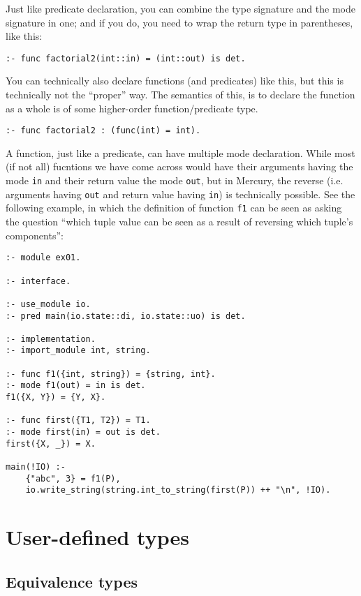   Just like predicate declaration, you can combine the type signature and the mode signature in one; and if you do, you need to wrap the return type in parentheses, like this:

\begin{lstlisting}[language=Mercury]
:- func factorial2(int::in) = (int::out) is det.
\end{lstlisting}

  You can technically also declare functions (and predicates) like this, but this is technically not the ``proper'' way. The semantics of this, is to declare the function as a whole is of some higher-order function/predicate type.
  
\begin{lstlisting}[language=Mercury]
:- func factorial2 : (func(int) = int).
\end{lstlisting}

A function, just like a predicate, can have multiple mode declaration. While most (if not all) fucntions we have come across would have their arguments having the mode \texttt{in} and their return value the mode \texttt{out}, but in Mercury, the reverse (i.e. arguments having \texttt{out} and return value having \texttt{in}) is technically possible. See the following example, in which the definition of function \texttt{f1} can be seen as asking the question ``which tuple value can be seen as a result of reversing which tuple's components'':

\begin{lstlisting}[language=Mercury]
:- module ex01.

:- interface.

:- use_module io.
:- pred main(io.state::di, io.state::uo) is det.

:- implementation.
:- import_module int, string.

:- func f1({int, string}) = {string, int}.
:- mode f1(out) = in is det.
f1({X, Y}) = {Y, X}.

:- func first({T1, T2}) = T1.
:- mode first(in) = out is det.
first({X, _}) = X.

main(!IO) :-
	{"abc", 3} = f1(P),
	io.write_string(string.int_to_string(first(P)) ++ "\n", !IO).
\end{lstlisting}


\section{User-defined types}

\subsection{Equivalence types}

